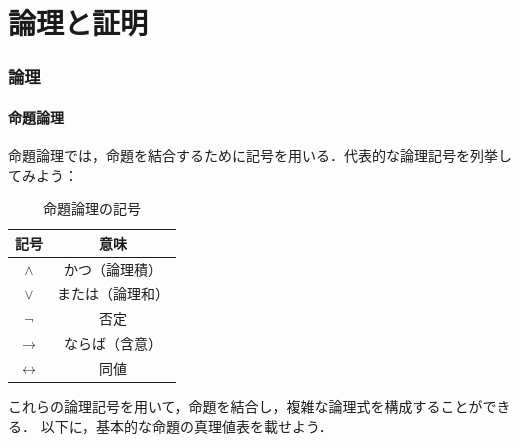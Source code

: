 \part{論理と証明}
\section{論理}
\subsection{命題論理}

命題論理では，命題を結合するために記号を用いる．代表的な論理記号を列挙してみよう：

\begin{table}[ht]
  \centering
  \caption{命題論理の記号}
  \begin{tabular}{c|c}
    \hline
    記号                & 意味                       \\
    \hline
    $\land$           & かつ（論理積\index{ろんりせき@論理積}） \\
    $\lor$            & または（論理和\index{ろんりわ@論理和}） \\
    $\lnot$           & 否定\index{ひてい@否定}         \\
    $\to$             & ならば（含意\index{がんい@含意}）    \\
    $\leftrightarrow$ & 同値 \index{どうち@同値} \\
    \hline
  \end{tabular}
\end{table}

これらの論理記号を用いて，命題を結合し，複雑な論理式を構成することができる．
以下に，基本的な命題の真理値表を載せよう．

